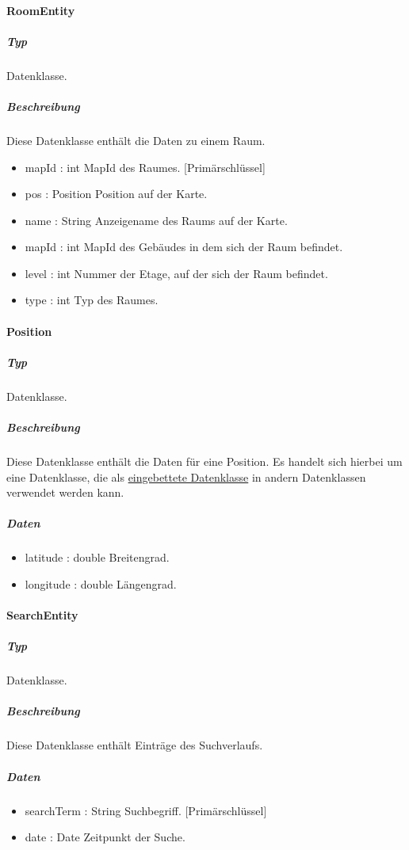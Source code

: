 \paragraph{RoomEntity}
\subparagraph*{Typ}
Datenklasse.
\subparagraph*{Beschreibung}
Diese Datenklasse enthält die Daten zu einem Raum.
\begin{itemize}
    \item mapId : int MapId des Raumes. [Primärschlüssel]
    \item pos : Position Position auf der Karte.
    \item name : String Anzeigename des Raums auf der Karte.
    \item mapId : int MapId des Gebäudes in dem sich der Raum befindet.
    \item level : int Nummer der Etage, auf der sich der Raum befindet.
    \item type : int Typ des Raumes.
\end{itemize}

\paragraph{Position}
\subparagraph*{Typ}
Datenklasse.
\subparagraph*{Beschreibung}
Diese Datenklasse enthält die Daten für eine Position.
Es handelt sich hierbei um eine Datenklasse, die als \href{https://developer.android.com/reference/android/arch/persistence/room/Embedded}
{eingebettete Datenklasse} in andern Datenklassen verwendet werden kann. 
\subparagraph*{Daten}
\begin{itemize}
    \item latitude : double Breitengrad.
    \item longitude : double Längengrad.
\end{itemize}

\paragraph{SearchEntity}
\subparagraph*{Typ}
Datenklasse.
\subparagraph*{Beschreibung}
Diese Datenklasse enthält Einträge des Suchverlaufs.
\subparagraph*{Daten}
\begin{itemize}
    \item searchTerm : String Suchbegriff. [Primärschlüssel]
    \item date : Date Zeitpunkt der Suche.
\end{itemize}

